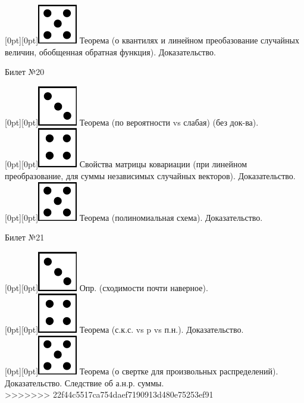 \documentclass[10pt]{article}
\begin{document}
\raisebox{-1pt}[0pt][0pt]{\includegraphics[width=0.02\linewidth]{5.png}}   Теорема (о квантилях и линейном преобазование случайных величин, обобщенная обратная функция). Доказательство. \\

\begin{center} {\Large Билет №20} \end{center} 

\raisebox{-1pt}[0pt][0pt]{\includegraphics[width=0.02\linewidth]{3.png}} Теорема (по вероятности vs слабая) (без док-ва). \\  

\raisebox{-1pt}[0pt][0pt]{\includegraphics[width=0.02\linewidth]{4.png}} Свойства матрицы ковариации (при линейном преобразование, для суммы независимых случайных векторов). Доказательство. \\

\raisebox{-1pt}[0pt][0pt]{\includegraphics[width=0.02\linewidth]{5.png}} Теорема (полиномиальная схема). Доказательство. \\

\begin{center} {\Large Билет №21} \end{center} 

\raisebox{-1pt}[0pt][0pt]{\includegraphics[width=0.02\linewidth]{3.png}} Опр. (сходимости почти наверное). \\

\raisebox{-1pt}[0pt][0pt]{\includegraphics[width=0.02\linewidth]{4.png}} Теорема (с.к.с. vs p vs п.н.). Доказательство. \\ 

\raisebox{-1pt}[0pt][0pt]{\includegraphics[width=0.02\linewidth]{5.png}} Теорема (о свертке для произвольных распределений). Доказательство. Следствие об а.н.р. суммы. \\ 
>>>>>>> 22f44c5517ca754daef7190913d480e75253ef91
\end{document}
